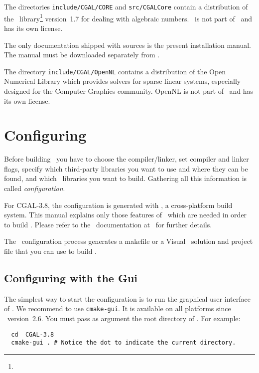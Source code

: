 The directories \texttt{include/CGAL/CORE} and \texttt{src/CGALCore} contain a
distribution of the \core\ library\footnote{\corepage} version~1.7 for
dealing with algebraic numbers. \core\ is not part of \cgal\ and has its
own license.

The only documentation shipped with \cgal{} sources is the present
installation manual. The \cgal{} manual must be downloaded separately from
\cgaldownloadpage.

The directory \texttt{include/CGAL/OpenNL} contains a distribution of the 
Open Numerical Library which provides solvers for sparse linear systems, especially designed 
for the Computer Graphics community. OpenNL is not part of \cgal\ and has its own license.

\section{Configuring \cgal}

Before building \cgal\ you have to choose the compiler/linker, 
set compiler and linker  flags, specify which
third-party libraries you want to use and where they can be found, and 
which \cgal\ libraries you want to build. Gathering
all this information is called {\em configuration}. 

For CGAL-3.8, the configuration is generated with \cmake, a
cross-platform build system.  This manual explains only those features of
\cmake\ which are needed in order to build \cgal. Please refer to the \cmake\ 
documentation at \cmakepage\ for further details.

The \cmake\ configuration process generates a makefile or a Visual \CC\
solution and project file that you can use to build \cgal.

\subsection{Configuring \cgal{} with the \cmake{} {\sc Gui} }

The simplest way to start the configuration is to run the graphical
user interface of \cmake. We recommend to use \texttt{cmake-gui}. It
is available on all platforms since \cmake\ version~2.6.   You must pass as 
argument the root directory of \cgal. For example:

{\ccTexHtml{\scriptsize}{}
\begin{verbatim}
  cd  CGAL-3.8
  cmake-gui . # Notice the dot to indicate the current directory.
\end{verbatim}
}

